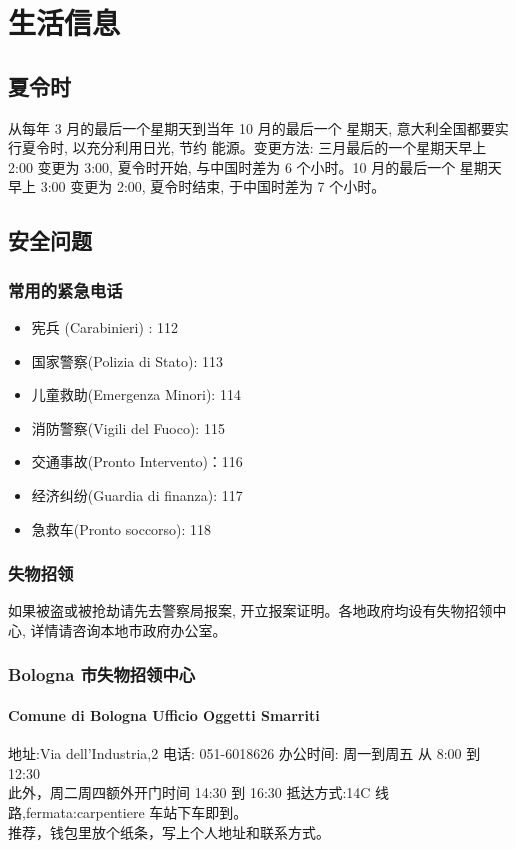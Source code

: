 \chapter{生活信息}              

\section{夏令时} 

从每年 3 月的最后一个星期天到当年 10 月的最后一个 星期天, 意大利全国都要实行夏令时, 以充分利用日光, 节约 能源。变更方法: 三月最后的一个星期天早上 2:00 变更为 3:00, 夏令时开始, 与中国时差为 6 个小时。10 月的最后一个 星期天早上 3:00 变更为 2:00, 夏令时结束, 于中国时差为 7 个小时。

\section{安全问题}

\subsection{常用的紧急电话}

\begin{itemize}
\item 宪兵 (Carabinieri) : 112 
\item 国家警察(Polizia di Stato): 113 
\item 儿童救助(Emergenza Minori): 114
\item 消防警察(Vigili del Fuoco): 115 
\item 交通事故(Pronto Intervento)：116 
\item 经济纠纷(Guardia di finanza): 117
\item 急救车(Pronto soccorso): 118
\end{itemize}

\subsection{失物招领}
如果被盗或被抢劫请先去警察局报案, 开立报案证明。各地政府均设有失物招领中心, 详情请咨询本地市政府办公室。


\subsection{Bologna 市失物招领中心}
\subsubsection{Comune di Bologna Ufficio Oggetti Smarriti}
地址:Via dell’Industria,2
电话: 051-6018626
办公时间: 周一到周五 从 8:00 到 12:30 \\
此外，周二周四额外开门时间 14:30 到 16:30
抵达方式:14C 线路,fermata:carpentiere 车站下车即到。 \\
推荐，钱包里放个纸条，写上个人地址和联系方式。


